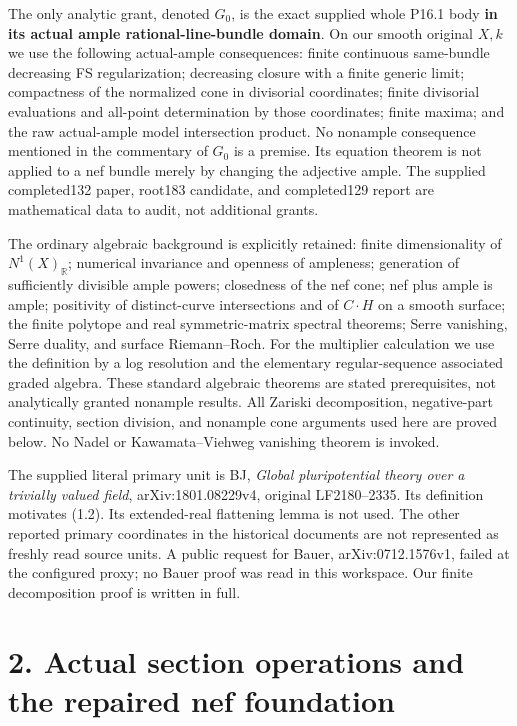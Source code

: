 \documentclass[
  10pt,
]{article}
\begin{document}
The only analytic grant, denoted \(G_0\), is the exact supplied whole
P16.1 body \textbf{in its actual ample rational-line-bundle domain}. On
our smooth original \(X,k\) we use the following actual-ample
consequences: finite continuous same-bundle decreasing FS
regularization; decreasing closure with a finite generic limit;
compactness of the normalized cone in divisorial coordinates; finite
divisorial evaluations and all-point determination by those coordinates;
finite maxima; and the raw actual-ample model intersection product. No
nonample consequence mentioned in the commentary of \(G_0\) is a
premise. Its equation theorem is not applied to a nef bundle merely by
changing the adjective ample. The supplied completed132 paper, root183
candidate, and completed129 report are mathematical data to audit, not
additional grants.

The ordinary algebraic background is explicitly retained: finite
dimensionality of \(N^1(X)_{\mathbb R}\); numerical invariance and
openness of ampleness; generation of sufficiently divisible ample
powers; closedness of the nef cone; nef plus ample is ample; positivity
of distinct-curve intersections and of \(C\cdot H\) on a smooth surface;
the finite polytope and real symmetric-matrix spectral theorems; Serre
vanishing, Serre duality, and surface Riemann--Roch. For the multiplier
calculation we use the definition by a log resolution and the elementary
regular-sequence associated graded algebra. These standard algebraic
theorems are stated prerequisites, not analytically granted nonample
results. All Zariski decomposition, negative-part continuity, section
division, and nonample cone arguments used here are proved below. No
Nadel or Kawamata--Viehweg vanishing theorem is invoked.

The supplied literal primary unit is BJ, \emph{Global pluripotential
theory over a trivially valued field}, arXiv:1801.08229v4, original
LF2180--2335. Its definition motivates (1.2). Its extended-real
flattening lemma is not used. The other reported primary coordinates in
the historical documents are not represented as freshly read source
units. A public request for Bauer, arXiv:0712.1576v1, failed at the
configured proxy; no Bauer proof was read in this workspace. Our finite
decomposition proof is written in full.

\section{2. Actual section operations and the repaired nef
foundation}\label{actual-section-operations-and-the-repaired-nef-foundation}
\end{document}
